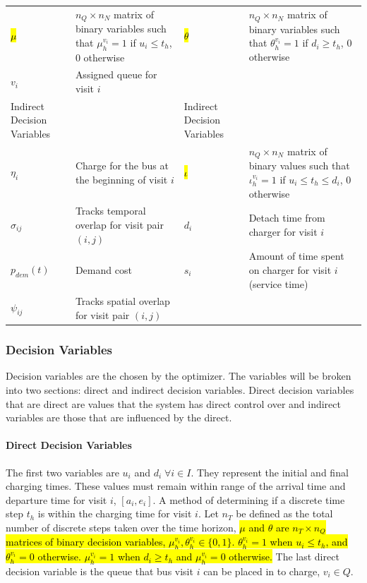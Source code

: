 \documentclass[11pt,a4paper,final]{article}
\newcommand{\Iset}{I}                       %
\newcommand{\Qset}{Q}                       %
\begin{document}
\begin{table}[htbp]
\begin{tabularx}{\textwidth}{L{0.3} L{1.2} L{0.3} L{1.2}}
\hl{$\mu$} & \(n_Q \times n_N\) matrix of binary variables such that \(\mu_h^{v_i} = 1\) if \(u_i \le t_h\), 0 otherwise & \hl{$\theta$} & \(n_Q \times n_N\) matrix of binary variables such that \(\theta_h^{v_i} = 1\) if \(d_i \ge t_h\), 0 otherwise\\[0pt]
\(v_i\) & Assigned queue for visit \(i\) &  & \\[0pt]
Indirect Decision Variables &  & Indirect Decision Variables & \\[0pt]
\(\eta_i\) & Charge for the bus at the beginning of visit \(i\) & \hl{$\iota$} & \(n_Q \times n_N\) matrix of binary values such that \(\iota_h^{v_i} = 1\) if \(u_i \le t_h \le d_i\), 0 otherwise\\[0pt]
\(\sigma_{ij}\) & Tracks temporal overlap for visit pair \((i,j)\) & \(d_i\) & Detach time from charger for visit \(i\)\\[0pt]
\(p_{dem}(t)\) & Demand cost & \(s_i\) & Amount of time spent on charger for visit \(i\) (service time)\\[0pt]
\(\psi_{ij}\) & Tracks spatial overlap for visit pair \((i,j)\) &  & \\[0pt]
\hline
\end{tabularx}
\end{table}

\subsubsection{Decision Variables}
\label{sec:decision-variables}
Decision variables are the chosen by the optimizer. The variables will be broken into two sections: direct and indirect
decision variables. Direct decision variables that are direct are values that the system has direct control over and
indirect variables are those that are influenced by the direct.

\paragraph{Direct Decision Variables}
\label{sec:direct-decision-variables}
The first two variables are \(u_i\) and \(d_i \; \forall i \in \Iset\). They represent the initial and final charging times. These
values must remain within range of the arrival time and departure time for visit \(i\), \([a_i, e_i]\). A method of
determining if a discrete time step \(t_h\) is within the charging time for visit \(i\). Let \(n_T\) be defined as the total
number of discrete steps taken over the time horizon, \hl{$\mu$ and $\theta$ are $n_T \times n_Q$ matrices of binary decision variables, $\mu_h^{v_i}, \theta_h^{v_i} \in \{0, 1\}$. $\theta_h^{v_i} = 1$ when $u_i \le t_h$, and $\theta_h^{v_i} = 0$ otherwise. $\mu_h^{v_i} = 1$ when $d_i \ge t_h$ and $\mu_h^{v_i} = 0$ otherwise.} The last direct decision variable is the queue that
bus visit \(i\) can be placed in to charge, \(v_i \in \Qset\).
\end{document}
